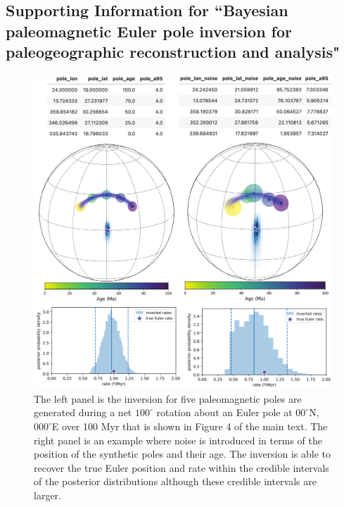 \documentclass[11pt,letterpaper]{article}
\begin{document}
\renewcommand{\thefigure}{S\arabic{figure}}
\renewcommand{\thetable}{S\arabic{table}}
\subsection*{Supporting Information for ``Bayesian paleomagnetic Euler pole inversion for paleogeographic reconstruction and analysis"}

\begin{figure}[h!]
\noindent\includegraphics[width=6 in]{SI_fig_synthetic_noise.pdf}
\caption{The left panel is the inversion for five paleomagnetic poles are generated during a net $100^\circ$ rotation about an Euler pole at $00^\circ$N, $000^\circ$E over 100 Myr that is shown in Figure 4 of the main text. The right panel is an example where noise is introduced in terms of the position of the synthetic poles and their age. The inversion is able to recover the true Euler position and rate within the credible intervals of the posterior distributions although these credible intervals are larger.}
\label{pdffiguresample}
\end{figure}
\end{document}
